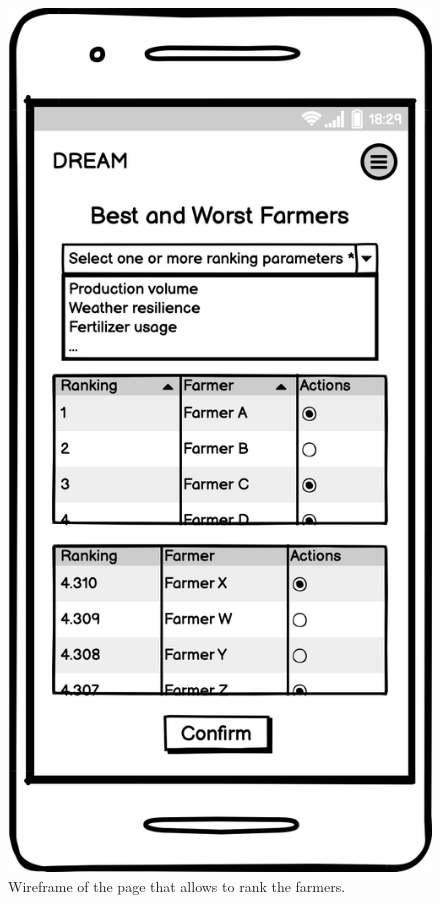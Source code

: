 \documentclass{article}
\begin{document}
\begin{figure}[H]
    \centering
    \includegraphics[scale=0.15]{wireframes/bestworstfarmers.png}
    \caption{Wireframe of the page that allows to rank the farmers.}
\end{figure}
\end{document}
